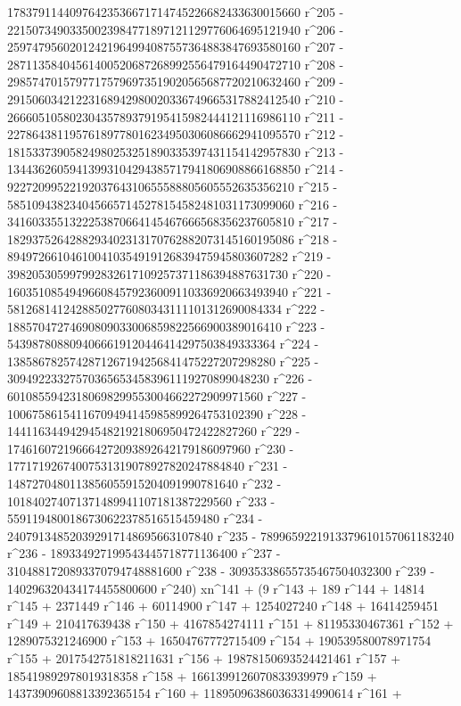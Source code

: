        17837911440976423536671714745226682433630015660 r^205 - 
       22150734903350023984771897121129776064695121940 r^206 - 
       25974795602012421964994087557364883847693580160 r^207 - 
       28711358404561400520687268992556479164490472710 r^208 - 
       29857470157977175796973519020565687720210632460 r^209 - 
       29150603421223168942980020336749665317882412540 r^210 - 
       26660510580230435789379195415982444121116986110 r^211 - 
       22786438119576189778016234950306086662941095570 r^212 - 
       18153373905824980253251890335397431154142957830 r^213 - 
       13443626059413993104294385717941806908866168850 r^214 - 
       9227209952219203764310655588805605552635356210 r^215 - 
       5851094382340456657145278154582481031173099060 r^216 - 
       3416033551322253870664145467666568356237605810 r^217 - 
       1829375264288293402313170762882073145160195086 r^218 - 
       894972661046100410354919126839475945803607282 r^219 - 
       398205305997992832617109257371186394887631730 r^220 - 
       160351085494966084579236009110336920663493940 r^221 - 
       58126814124288502776080343111101312690084334 r^222 - 
       18857047274690809033006859822566900389016410 r^223 - 
       5439878088094066619120446414297503849333364 r^224 - 
       1385867825742871267194256841475227207298280 r^225 - 
       309492233275703656534583961119270899048230 r^226 - 
       60108559423180698299553004662272909971560 r^227 - 
       10067586154116709494145985899264753102390 r^228 - 
       1441163449429454821921806950472422827260 r^229 - 
       174616072196664272093892642179186097960 r^230 - 
       17717192674007531319078927820247884840 r^231 - 
       1487270480113856055915204091990781640 r^232 - 
       101840274071371489941107181387229560 r^233 - 
       5591194800186730622378516515459480 r^234 - 
       240791348520392917148695663107840 r^235 - 
       7899659221913379610157061183240 r^236 - 
       189334927199543445718771136400 r^237 - 
       3104881720893370794748881600 r^238 - 
       30935338655735467504032300 r^239 - 
       140296320434174455800600 r^240) xn^141 + (9 r^143 + 
       189 r^144 + 14814 r^145 + 2371449 r^146 + 60114900 r^147 + 
       1254027240 r^148 + 16414259451 r^149 + 210417639438 r^150 + 
       4167854274111 r^151 + 81195330467361 r^152 + 
       1289075321246900 r^153 + 16504767772715409 r^154 + 
       190539580078971754 r^155 + 2017542751818211631 r^156 + 
       19878150693524421461 r^157 + 185419892978019318358 r^158 + 
       1661399126070833939979 r^159 + 14373909608813392365154 r^160 + 
       118950963860363314990614 r^161 + 
